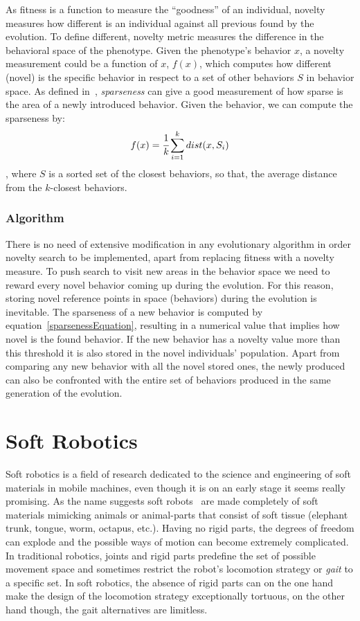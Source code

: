 As fitness is a function to measure the ``goodness'' of an individual, novelty measures how different is an individual against all previous found by the evolution. To define different, novelty metric measures the difference in the behavioral space of the phenotype. Given the phenotype's behavior $x$, a novelty measurement could be a function of $x$, $f(x)$, which computes how different (novel) is the specific behavior in respect to a set of other behaviors $S$ in behavior space.  As defined in~\cite{lehman2008exploiting,lehman2011abandoning}, \emph{sparseness} can give a good measurement of how sparse is the area of a newly introduced behavior. Given the behavior, we can compute the sparseness by:
\begin{equation}
\label{sparsenessEquation}
f(x) = \cfrac{1}{k} \sum_{i=1}^{k} dist(x, S_i)
\end{equation}
, where $S$ is a sorted set of the closest behaviors, so that, the average distance from the $k$-closest behaviors.


\subsubsection*{Algorithm}

There is no need of extensive modification in any evolutionary algorithm in order novelty search to be implemented, apart from replacing fitness with a novelty measure. To push search to visit new areas in the behavior space we need to reward every novel behavior coming up during the evolution. For this reason, storing novel reference points in space (behaviors) during the evolution is inevitable. The sparseness of a new behavior is computed by equation~\ref{sparsenessEquation}, resulting in a numerical value that implies how novel is the found behavior. If the new behavior has a novelty value more than this threshold it is also stored in the novel individuals' population. Apart from comparing any new behavior with all the novel stored ones, the newly produced can also be confronted with the entire set of behaviors produced in the same generation of the evolution.



\section{Soft Robotics}
Soft robotics is a field of research dedicated to the science and engineering of soft materials in mobile machines, even though it is on an early stage it seems really promising. As the name suggests soft robots~\cite{trivedi2008soft, pfeifer2012challenges} are made completely of soft materials mimicking animals or animal-parts that consist of soft tissue (elephant trunk, tongue, worm, octapus, etc.). Having no rigid parts, the degrees of freedom can explode and the possible ways of motion can become extremely complicated. In traditional robotics, joints and rigid parts predefine the set of possible movement space and sometimes restrict the robot's locomotion strategy or \emph{gait} to a specific set. In soft robotics, the absence of rigid parts can on the one hand make the design of the locomotion strategy exceptionally tortuous, on the other hand though, the gait alternatives are limitless.

